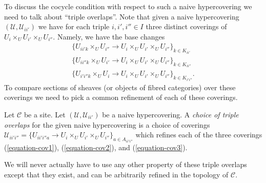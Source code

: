 \medskip\noindent
To discuss the cocycle condition with respect to such a naive
hypercovering we need to talk about ``triple overlaps''.
Note that given a naive hypercovering
$(\mathcal{U}, \mathcal{U}_{ii'})$
we have for each triple $i, i', i'' \in I$ three distinct
coverings of $U_i \times_U U_{i'} \times_U U_{i''}$.
Namely, we have the base changes
\begin{align}
\label{equation-cov1} \{U_{ii'k} \times_U U_{i''} \to
U_i \times_U U_{i'} \times_U U_{i''}\}_{k \in K_{ii'}} \\
\label{equation-cov2} \{U_{ii''k} \times_U U_{i'} \to
U_i \times_U U_{i'} \times_U U_{i''}\}_{k \in K_{ii''}} \\
\label{equation-cov3} \{U_{i'i''k} \times_U U_i \to
U_i \times_U U_{i'} \times_U U_{i''}\}_{k \in K_{i'i''}}.
\end{align}
To compare sections of sheaves (or objects of fibred categories)
over these coverings we need to pick a common refinement
of each of these coverings.

\begin{definition}
\label{definition-triple-overlaps}
Let $\mathcal{C}$ be a site.
Let $(\mathcal{U}, \mathcal{U}_{ii'})$ be a naive hypercovering.
A {\it choice of triple overlaps} for the given naive hypercovering
is a choice of coverings
$\mathcal{U}_{ii'i''} =
\{U_{ii'i''a} \to U_i \times_U U_{i'} \times_U U_{i''}\}_{a \in A_{ii'i''}}$
which refines each of the three coverings
(\ref{equation-cov1}), (\ref{equation-cov2}), and (\ref{equation-cov3}).
\end{definition}

\noindent
We will never actually have to use any other property of these triple
overlaps except that they exist, and can be arbitrarily refined
in the topology of $\mathcal{C}$.

